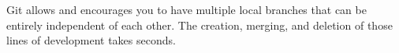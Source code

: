Git allows and encourages you to have multiple local branches that can be entirely independent of each other. The creation, merging, and deletion of those lines of development takes seconds.


